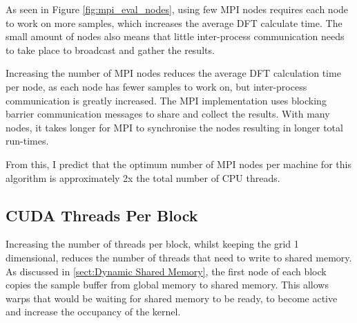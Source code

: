 \documentclass[11pt,a4paper]{article}
\begin{document}
As seen in Figure \ref{fig:mpi_eval_nodes}, using few MPI nodes requires each node to work on more samples, which increases the average DFT calculate time. The small amount of nodes also means that little inter-process communication needs to take place to broadcast and gather the results.

Increasing the number of MPI nodes reduces the average DFT calculation time per node, as each node has fewer samples to work on, but inter-process communication is greatly increased. The MPI implementation uses blocking barrier communication messages to share and collect the results. With many nodes, it takes longer for MPI to synchronise the nodes resulting in longer total run-times.

From this, I predict that the optimum number of MPI nodes per machine for this algorithm is approximately 2x the total number of CPU threads.

\subsection{CUDA Threads Per Block}
Increasing the number of threads per block, whilst keeping the grid 1 dimensional, reduces the number of threads that need to write to shared memory. As discussed in \ref{sect:Dynamic Shared Memory}, the first node of each block copies the sample buffer from global memory to shared memory. This allows warps that would be waiting for shared memory to be ready, to become active and increase the occupancy of the kernel.

\begin{figure}[H]%
    \centering
    \qquad
    \vspace{5pt}
    \caption{}%
    \label{fig:cuda_threads_per_block}%
\end{figure}
\end{document}
